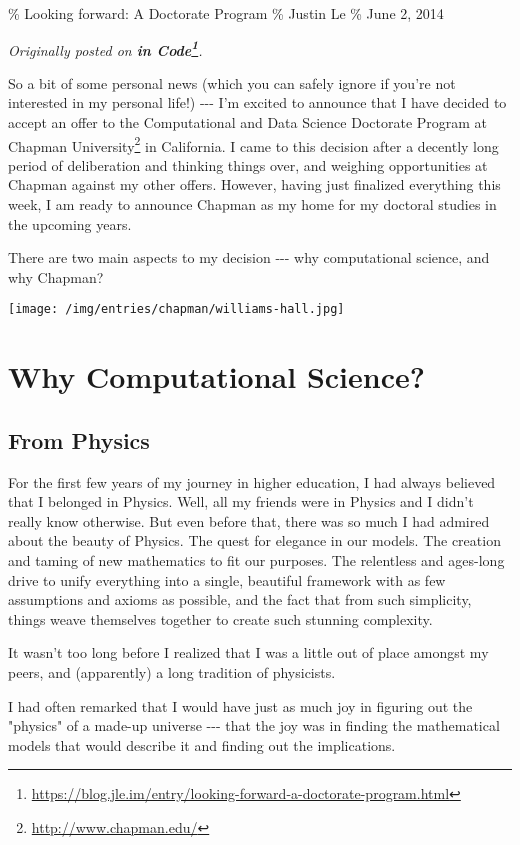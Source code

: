 \documentclass[]{article}
\renewcommand{\href}[2]{#2\footnote{\url{#1}}}
\begin{document}
\% Looking forward: A Doctorate Program \% Justin Le \% June 2, 2014

\emph{Originally posted on
\textbf{\href{https://blog.jle.im/entry/looking-forward-a-doctorate-program.html}{in
Code}}.}

So a bit of some personal news (which you can safely ignore if you're not
interested in my personal life!) -\/-\/- I'm excited to announce that I have
decided to accept an offer to the Computational and Data Science Doctorate
Program at \href{http://www.chapman.edu/}{Chapman University} in California. I
came to this decision after a decently long period of deliberation and thinking
things over, and weighing opportunities at Chapman against my other offers.
However, having just finalized everything this week, I am ready to announce
Chapman as my home for my doctoral studies in the upcoming years.

There are two main aspects to my decision -\/-\/- why computational science, and
why Chapman?

\texttt{[image: /img/entries/chapman/williams-hall.jpg]}

\section{Why Computational Science?}

\subsection{From Physics}

For the first few years of my journey in higher education, I had always believed
that I belonged in Physics. Well, all my friends were in Physics and I didn't
really know otherwise. But even before that, there was so much I had admired
about the beauty of Physics. The quest for elegance in our models. The creation
and taming of new mathematics to fit our purposes. The relentless and ages-long
drive to unify everything into a single, beautiful framework with as few
assumptions and axioms as possible, and the fact that from such simplicity,
things weave themselves together to create such stunning complexity.

It wasn't too long before I realized that I was a little out of place amongst my
peers, and (apparently) a long tradition of physicists.

I had often remarked that I would have just as much joy in figuring out the
"physics" of a made-up universe -\/-\/- that the joy was in finding the
mathematical models that would describe it and finding out the implications.
\end{document}
